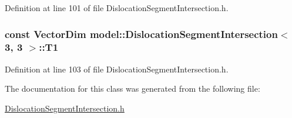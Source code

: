 Definition at line 101 of file Dislocation\+Segment\+Intersection.\+h.

\hypertarget{classmodel_1_1_dislocation_segment_intersection_3_013_00_013_01_4_a1c3da7dd954492e63747f373084585a7}{}
\subsubsection[{T1}]{\setlength{\rightskip}{0pt plus 5cm}const Vector\+Dim {\bf model\+::\+Dislocation\+Segment\+Intersection}$<$ 3, 3 $>$\+::T1}\label{classmodel_1_1_dislocation_segment_intersection_3_013_00_013_01_4_a1c3da7dd954492e63747f373084585a7}


Definition at line 103 of file Dislocation\+Segment\+Intersection.\+h.



The documentation for this class was generated from the following file\+:\begin{DoxyCompactItemize}
\item 
\hyperlink{_dislocation_segment_intersection_8h}{Dislocation\+Segment\+Intersection.\+h}\end{DoxyCompactItemize}
